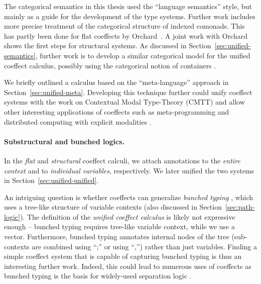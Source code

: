 The categorical semantics in this thesis used the ``language semantics'' style, but mainly as a
guide for the development of the type systems. Further work includes more precise treatment of
the categorical structure of indexed comonads. This has partly been done for flat coeffects by
Orchard~\cite{comonads-dom-thesis}. A joint work with Orchard~\cite{coeffects-icfp14} shows the
first steps for structural systems. As discussed in Section~\ref{sec:unified-semantics}, further
work is to develop a similar categorical model for the unified coeffect calculus, possibly using
the categorical notion of containers \cite{types-containers}.

We briefly outlined a calculus based on the ``meta-language'' approach in Section~\ref{sec:unified-meta}.
Developing this technique further could unify coeffect systems with the work on Contextual Modal
Type-Theory (CMTT) \cite{logic-cmtt} and allow other interesting applications of coeffects such
as meta-programming \cite{logic-cmtt} and distributed computing with explicit modalities \cite{app-distributed-ml5}.


\paragraph{Substructural and bunched logics.}

In the \emph{flat} and \emph{structural} coeffect calculi, we attach annotations to the \emph{entire
context} and to \emph{individual variables}, respectively. We later unified the two systems
in Section~\ref{sec:unified-unified}.

An intriguing question is whether coeffects can generalize \emph{bunched typing} \cite{substruct-bunched},
which uses a tree-like structure of variable contexts (also discussed in Section~\ref{sec:path-logic}).
The definition of the \emph{unified coeffect calculus} is likely not expressive enough -- bunched
typing requires tree-like variable context, while we use a vector. Furthermore, bunched typing
annotates internal nodes of the tree (sub-contexts are combined using ``;'' or using ``,'') rather
than just variables. Finding a simple coeffect system that is capable of capturing bunched typing
is thus an interesting further work. Indeed, this could lead to numerous uses of coeffects as
bunched typing is the basis for widely-used separation logic \cite{substruct-separation-logic}.



